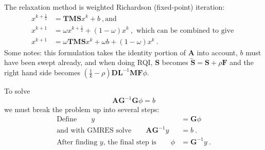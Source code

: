\documentclass[12pt, letterpaper]{article}
\newcommand{\ve}[1]{\ensuremath{\mathbf{#1}}}
\begin{document}

The relaxation method is weighted Richardson (fixed-point) iteration: 
\begin{align}
  x^{k + \frac{1}{2}} &= \ve{TMS}x^{k} + b \:, \text{and} \nonumber \\
  x^{k+1} &= \omega x^{k + \frac{1}{2}} + (1 - \omega) x^{k} \:, \text{ which can be combined to give } \nonumber \\
  x^{k+1} &= \omega \ve{TMS}x^{k} + \omega b + (1 - \omega) x^{k} \:. 
  \label{eq:relax}
 \end{align}
Some notes: this formulation takes the identity portion of $\ve{A}$ into account, $b$ must have been swept already, and when doing RQI, $\mathbf{S}$ becomes $\tilde{\ve{S}} = \ve{S} + \rho\ve{F}$ and the right hand side becomes $(\frac{1}{k} - \rho)\ve{DL}^{-1}\ve{MF}\phi$.

To solve 
%
\begin{equation}
  \ve{A} \ve{G}^{-1} \ve{G} \phi = b \nonumber
  \label{eq:precondTrans}
\end{equation}
% 
we must break the problem up into several steps: 
%
\begin{align}
  \text{Define} \qquad y &= \ve{G}\phi \\
  \text{and with GMRES solve} \qquad \ve{AG}^{-1}y &= b \:. \\
  \text{After finding }y\text{, the final step is} \qquad \phi &= \ve{G}^{-1}y \:.
\end{align}
%
\end{document}
